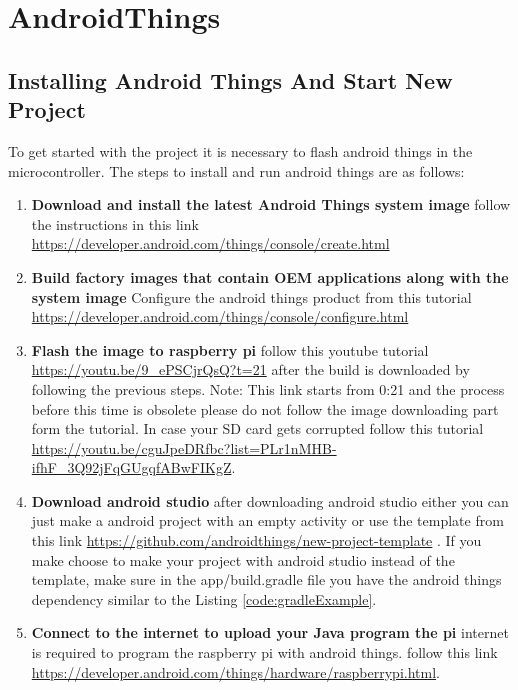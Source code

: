 \section{AndroidThings}
    \subsection{Installing Android Things And Start New Project}
        To get started with the project it is necessary to flash android things in the
        microcontroller. The steps to install and run android things are as follows:
        \begin{enumerate}
            \item 
                \textbf{Download and install the latest Android Things system image}
                    follow the instructions in this link \url{https://developer.android.com/things/console/create.html}
            \item 
                \textbf{Build factory images that contain OEM applications along with the system image}
                        Configure the android things product from this tutorial 
                        \url{https://developer.android.com/things/console/configure.html}
                        
            \item 
            \textbf{Flash the image to raspberry pi}
                follow this youtube tutorial
                \url{https://youtu.be/9_ePSCjrQsQ?t=21} after the build is downloaded by following the previous steps.
                Note: This link starts from 0:21 and the process before this time is obsolete
                please do not follow the image downloading part form the tutorial.
                In case your SD card gets corrupted follow this tutorial
                \url{https://youtu.be/cguJpeDRfbc?list=PLr1nMHB-ifhF_3Q92jFqGUgqfABwFIKgZ}.
            \item 
                \textbf{Download android studio}
                    after downloading android studio either you can just make a android project 
                    with an empty activity or use the template from this 
                    link \url{https://github.com/androidthings/new-project-template}
                    .
                    If you make choose to make your project with android studio instead of the
                    template, make sure in the app/build.gradle file you have the android things
                    dependency similar to the Listing \ref{code:gradleExample}.
            \item 
                \textbf{Connect to the internet to upload your Java program the pi}
                    internet is required to program the raspberry pi with android things.
                    follow this link \url{https://developer.android.com/things/hardware/raspberrypi.html}.                                  
        \end{enumerate}
